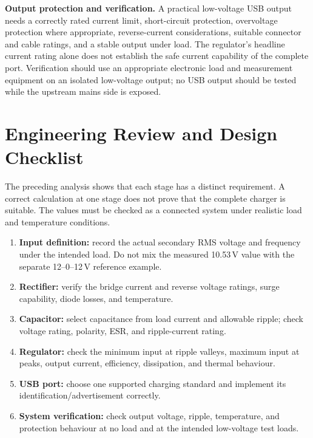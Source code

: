 \documentclass[journal,12pt,twocolumn]{IEEEtran}
\begin{document}
\textbf{Output protection and verification.}
A practical low-voltage USB output needs a correctly rated current
limit, short-circuit protection, overvoltage protection where
appropriate, reverse-current considerations, suitable connector
and cable ratings, and a stable output under load. The regulator's
headline current rating alone does not establish the safe current
capability of the complete port. Verification should use an
appropriate electronic load and measurement equipment on an
isolated low-voltage output; no USB output should be tested while
the upstream mains side is exposed.

\section{Engineering Review and Design Checklist}
The preceding analysis shows that each stage has a distinct
requirement. A correct calculation at one stage does not prove that
the complete charger is suitable. The values must be checked as a
connected system under realistic load and temperature conditions.

\begin{enumerate}[leftmargin=1.6em]
    \item \textbf{Input definition:} record the actual secondary RMS
    voltage and frequency under the intended load. Do not mix the
    measured 10.53\,V value with the separate 12--0--12\,V reference
    example.
    \item \textbf{Rectifier:} verify the bridge current and reverse
    voltage ratings, surge capability, diode losses, and temperature.
    \item \textbf{Capacitor:} select capacitance from load current
    and allowable ripple; check voltage rating, polarity, ESR, and
    ripple-current rating.
    \item \textbf{Regulator:} check the minimum input at ripple
    valleys, maximum input at peaks, output current, efficiency,
    dissipation, and thermal behaviour.
    \item \textbf{USB port:} choose one supported charging standard
    and implement its identification/advertisement correctly.
    \item \textbf{System verification:} check output voltage, ripple,
    temperature, and protection behaviour at no load and at the
    intended low-voltage test loads.
\end{enumerate}
\end{document}
